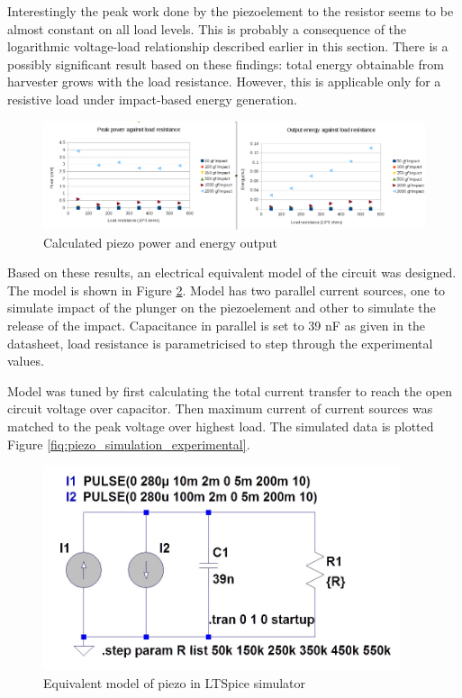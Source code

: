  Interestingly the peak work done by the piezoelement to the resistor seems to be almost constant on all load levels. This is probably a consequence of the logarithmic voltage-load relationship described earlier in this section. There is a possibly significant result based on these findings: total energy obtainable from harvester grows with the load resistance. However, this is applicable only for a resistive load under impact-based energy generation.
 
 \begin{figure}[htb]
  \begin{center}
  \includegraphics[width=\columnwidth]{images/own_measurement/piezo_power}
  \end{center}
  \caption{Calculated piezo power and energy output}
  \label{fig:piezo_power_energy}
\end{figure}

Based on these results, an electrical equivalent model of the circuit was designed. The model is shown in Figure \ref{fig:piezo_ltspice_equivalent}. Model has two parallel current sources, one to simulate impact of the plunger on the piezoelement and other to simulate the release of the impact. Capacitance in parallel is set to 39 nF as given in the datasheet, load resistance is parametricised to step through the experimental values.

Model was tuned by first calculating the total current transfer to reach the open circuit voltage over capacitor. Then maximum current of current sources was matched to the peak voltage over highest load.
The simulated data is plotted Figure \ref{fiq:piezo_simulation_experimental}.

 \begin{figure}[htb]
  \begin{center}
  \includegraphics[height=6cm]{images/own_dwg/ltspice_piezo}
  \end{center}
  \caption{Equivalent model of piezo in LTSpice simulator}
  \label{fig:piezo_ltspice_equivalent}
\end{figure}

